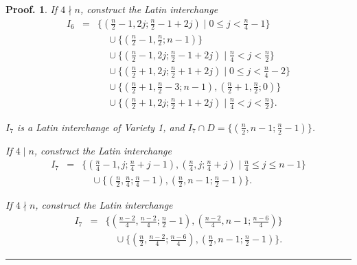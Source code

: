 \documentclass[12pt]{report}
\newtheorem{preproof}{{\bf Proof.}}
\newenvironment{proof}[1]{\begin{preproof}{\rm
               #1}\hfill{\rule[-0.5mm]{2mm}{2mm}}}{\end{preproof}}
\begin{document}
\begin{proof}
{If $4 \nmid n$, construct the Latin interchange
\begin{eqnarray*}
I_{6} & = & \{ (\displaystyle{\frac{n}{2}}-1,2j;\displaystyle{\frac{n}{2}}-1+2j) \mid 0 \leq j < \displaystyle{\frac{n}{4}} - 1 \} \\
&& \quad{}\cup \{ (\displaystyle{\frac{n}{2}}-1,\displaystyle{\frac{n}{2}}; n-1) \} \\
&& \quad{}\cup \{ (\displaystyle{\frac{n}{2}}-1,2j;\displaystyle{\frac{n}{2}}-1+2j) \mid \displaystyle{\frac{n}{4}} < j < \displaystyle{\frac{n}{2}} \} \\
&& \quad{}\cup \{ (\displaystyle{\frac{n}{2}}+1,2j;\displaystyle{\frac{n}{2}}+1+2j) \mid 0 \leq j < \displaystyle{\frac{n}{4}} - 2 \} \\
&& \quad{}\cup \{ (\displaystyle{\frac{n}{2}}+1,\displaystyle{\frac{n}{2}}-3; n-1), (\displaystyle{\frac{n}{2}}+1,\displaystyle{\frac{n}{2}}; 0) \} \\
&& \quad{}\cup \{ (\displaystyle{\frac{n}{2}}+1,2j;\displaystyle{\frac{n}{2}}+1+2j) \mid \displaystyle{\frac{n}{4}} < j < \displaystyle{\frac{n}{2}} \}.
\end{eqnarray*}

\noindent $I_{7}$ is a Latin interchange of Variety 1, and $I_{7} \cap D = \{
(\displaystyle{\frac{n}{2}}, n - 1; \displaystyle{\frac{n}{2}} - 1) \}$.

If $4 \mid n$, construct the Latin interchange
\begin{eqnarray*}
I_{7} & = & \{ (\displaystyle{\frac{n}{4}} - 1, j; \displaystyle{\frac{n}{4}} + j - 1), (\displaystyle{\frac{n}{4}}, j; \displaystyle{\frac{n}{4}} + j) \mid \displaystyle{\frac{n}{4}} \leq j \leq n -1 \} \\
&& \quad{}\cup \{ (\displaystyle{\frac{n}{2}}, \displaystyle{\frac{n}{4}}; \displaystyle{\frac{n}{4}} - 1),  (\displaystyle{\frac{n}{2}}, n-1; \displaystyle{\frac{n}{2}} - 1) \}.
\end{eqnarray*}

If $4 \nmid n$, construct the Latin interchange
\begin{eqnarray*}
I_{7} & = & \{ (\displaystyle{\frac{n-2}{4}}, \displaystyle{\frac{n-2}{4}}; \displaystyle{\frac{n}{2}}-1), (\displaystyle{\frac{n-2}{4}}, n-1; \displaystyle{\frac{n-6}{4}}) \} \\
&& \quad{}\cup \{ (\displaystyle{\frac{n}{2}}, \displaystyle{\frac{n-2}{4}}; \displaystyle{\frac{n-6}{4}}),  ( \displaystyle{\frac{n}{2}}, n-1; \displaystyle{\frac{n}{2}} - 1) \}.
\end{eqnarray*}

}
\end{proof}
\end{document}

